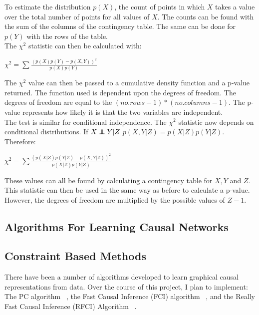 \documentclass{UoYCSproject}
\newcommand\independent{\protect\mathpalette{\protect\independenT}{\perp}}
\def\independenT#1#2{\mathrel{\rlap{$#1#2$}\mkern2mu{#1#2}}}
\begin{document}
To estimate the distribution $p(X)$, the count of points in which $X$ takes a value over the total number of points for all values of $X$. The counts can be found with the sum of the columns of the contingency table. The same can be done for $p(Y)$ with the rows of the table.\\

The $\chi^2$ statistic can then be calculated with:

\begin{center}
	$\chi^2 = \sum\frac{(p(X)p(Y)-p(X,Y))^2}{p(X)p(Y)}$
\end{center}

The $\chi^2$ value can then be passed to a cumulative density function and a p-value returned. The function used is dependent upon the degrees of freedom. The degrees of freedom are equal to the $(no. rows -1)*(no. columns -1)$. The p-value represents how likely it is that the two variables are independent.\\

The test is similar for conditional independence. The $\chi^2$ statistic now depends on conditional distributions. If $X \independent Y | Z$ $p(X,Y|Z) = p(X|Z)p(Y|Z)$. Therefore:\\

\begin{center}
	$\chi^2 = \sum\frac{(p(X|Z)p(Y|Z)-p(X,Y|Z))^2}{p(X|Z)p(Y|Z)}$
\end{center}

These values can all be found by calculating a contingency table for $X,Y $ and $ Z$.\\

This statistic can then be used in the same way as before to calculate a p-value. However, the degrees of freedom are multiplied by the possible values of $Z -1$. 

\subsection{Algorithms For Learning Causal Networks}
\subsection{Constraint Based Methods}
There have been a number of algorithms developed to learn graphical causal representations from data. Over the course of this project, I plan to implement: The PC algorithm ~\parencite{spirtes1991algorithm}, the Fast Causal Inference (FCI) algorithm ~\parencite{colombo2012learning}, and the Really Fast Causal Inference (RFCI) Algorithm ~\parencite{colombo2012learning}.
\end{document}
